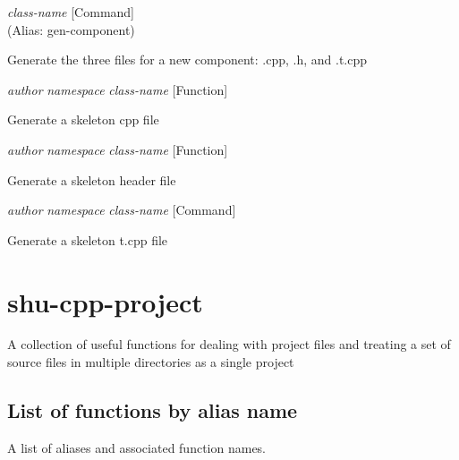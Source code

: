 \vspace{1em}
\noindent
{}
\usebox{\funcname}\emph{class-name}
 \hfill [Command]\\%
 (Alias: gen-component)

\begin{doc-string}
Generate the three files for a new component: .cpp, .h, and .t.cpp
\end{doc-string}

\vspace{1em}
\noindent
{}
\usebox{\funcname}\emph{author} \emph{namespace} \emph{class-name}
 \hfill [Function]

\begin{doc-string}
Generate a skeleton cpp file
\end{doc-string}

\vspace{1em}
\noindent
{}
\usebox{\funcname}\emph{author} \emph{namespace} \emph{class-name}
 \hfill [Function]

\begin{doc-string}
Generate a skeleton header file
\end{doc-string}

\vspace{1em}
\noindent
{}
\usebox{\funcname}\emph{author} \emph{namespace} \emph{class-name}
 \hfill [Command]

\begin{doc-string}
Generate a skeleton t.cpp file
\end{doc-string}

\section{shu-cpp-project}


A collection of useful functions for dealing with project files and treating
a set of source files in multiple directories as a single project


\subsection{List of functions by alias name}

A list of aliases and associated function names.



